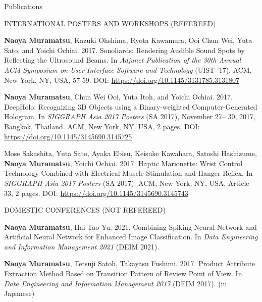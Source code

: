 \documentclass{resume} %
\begin{document}
\begin{rSection}{Publications}
\begin{rSubsection}{INTERNATIONAL POSTERS AND WORKSHOPS (REFEREED)}{}{}{}{}
        \item \textbf{Naoya Muramatsu}, Kazuki Ohshima, Ryota Kawamura, Ooi Chun Wei, Yuta Sato, and Yoichi Ochiai. 2017. Sonoliards: Rendering Audible Sound Spots by Reflecting the Ultrasound Beams. In \textit{Adjunct Publication of the 30th Annual ACM Symposium on User Interface Software and Technology} (UIST ’17). ACM, New York, NY, USA, 57-59. DOI: \url{https://doi.org/10.1145/3131785.3131807}

        \item \textbf{Naoya Muramatsu}, Chun Wei Ooi, Yuta Itoh, and Yoichi Ochiai. 2017. DeepHolo: Recognizing 3D Objects using a Binary-weighted Computer-Generated Hologram. In \textit{SIGGRAPH Asia 2017 Posters} (SA 2017), November 27– 30, 2017, Bangkok, Thailand. ACM, New York, NY, USA, 2 pages. DOI: \url{https://doi.org/10.1145/3145690.3145725}

        \item Mose Sakashita, Yuta Sato, Ayaka Ebisu, Keisuke Kawahara, Satoshi Hashizume, \textbf{Naoya Muramatsu}, Yoichi Ochiai. 2017. Haptic Marionette: Wrist Control Technology Combined with Electrical Muscle Stimulation and Hanger Reflex. In \textit{SIGGRAPH Asia 2017 Posters} (SA 2017). ACM, New York, NY, USA, Article 33, 2 pages. DOI: \url{https://doi.org/10.1145/3145690.3145743}
    \end{rSubsection}



    \begin{rSubsection}{DOMESTIC CONFERENCES (NOT REFEREED)}{}{}{}{}
        \item \textbf{Naoya Muramatsu}, Hai-Tao Yu. 2021. Combining Spiking Neural Network and Artificial Neural Network for Enhanced Image Classification. In \textit{Data Engineering and Information Management 2021} (DEIM 2021).
        \item \textbf{Naoya Muramatsu}, Tetsuji Satoh, Takayasu Fushimi. 2017. Product Attribute Extraction Method Based on Transition Pattern of Review Point of View. In \textit{Data Engineering and Information Management 2017} (DEIM 2017). (in Japanese) %
    \end{rSubsection}




\end{rSection}
\end{document}

